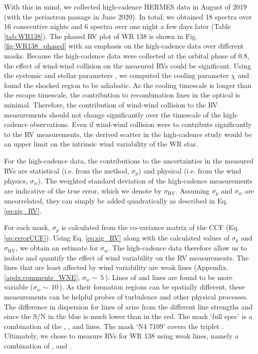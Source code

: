 With this in mind, we collected high-cadence HERMES data in August of 2019 (with the periastron passage in June 2020). In total, we obtained 18 spectra over 16 consecutive nights and 6 spectra over one night a few days later (Table \ref{tab:WR138}). The phased RV plot of WR 138 is shown in Fig. \ref{fig:WR138_phased} with an emphasis on the high-cadence data over different masks. Because the high-cadence data were collected at the orbital phase of 0.8, the effect of wind-wind collision \citep[e.g.][]{2002Luehrs} on the measured RVs could be significant. Using the systemic and stellar parameters \citep{1990Annuk,2016Richardson}, we computed the cooling parameter $\chi$ \citep{1992Stevens} and found the shocked region to be adiabatic. As the cooling timescale is longer than the escape timescale, the contribution to recombination lines in the optical is minimal. Therefore, the contribution of wind-wind collision to the RV measurements should not change significantly over the timescale of the high-cadence observations. Even if wind-wind collision were to contribute significantly to the RV measurements, the derived scatter in the high-cadence study would be an upper limit on the intrinsic wind variability of the WR star.


For the high-cadence data, the contributions to the uncertainties in the measured RVs are statistical (i.e. from the method, $\sigma_p$) and physical (i.e. from the wind physics, $\sigma_w$). The weighted standard deviation of the high-cadence measurements are indicative of the true error, which we denote by $\sigma_{\textrm{RV}}$. Assuming $\sigma_p$ and $\sigma_w$ are uncorrelated, they can simply be added quadratically as described in Eq. \ref{eq:sig_RV}.

For each mask, $\sigma_p$ is calculated from the co-variance matrix of the CCF (Eq. \ref{eq:errorCCF}). Using Eq. \ref{eq:sig_RV} along with the calculated values of $\sigma_p$ and $\sigma_{\textrm{RV}}$, we obtain an estimate for $\sigma_w$. The high-cadence data therefore allow us to isolate and quantify the effect of wind variability on the RV measurements. The lines that are least affected by wind variability are \nv{} weak lines (Appendix. \ref{apdx:comments_WNE}, $\sigma_w{\sim}\,5$\,\kms{}). Lines of \heii{} and \niv{} lines are found to be more variable ($\sigma_w{\sim}\,10$\,\kms{}). As their formation regions can be spatially different, these measurements can be helpful probes of turbulence and other physical processes. The difference in dispersion for lines of \niv{} arise from the different line strengths and since the S/N in the blue is much lower than in the red. The mask `full spec' is a combination of the \niv{}, \heii,{} and \nv{} lines. The mask `N4 7109' covers the triplet \NIVred{}. Ultimately, we chose to measure RVs for WR 138 using weak \nv{} lines, namely a combination of \NVblue,{} and \NVred{}.

